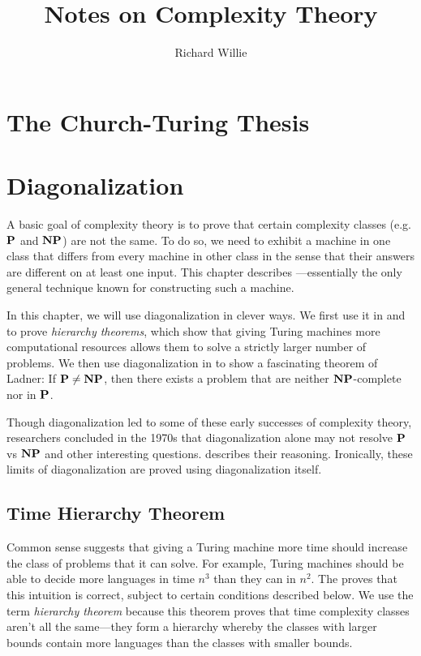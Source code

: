 \documentclass[11pt,twoside=off,numbers=noenddot]{scrbook}
\title{Notes on Complexity Theory}
\author{Richard Willie}
\begin{document}
\maketitle

\tableofcontents

\newpage

\chapter{The Church-Turing Thesis}

\chapter{Diagonalization}
A basic goal of complexity theory is to prove that certain complexity classes (e.g. $\textbf{P}$ and $\textbf{NP}$) are not the same. To do so, we need to exhibit a machine in one class that differs from every machine in other class in the sense that their answers are different on at least one input. This chapter describes —essentially the only general technique known for constructing such a machine.

In this chapter, we will use diagonalization in clever ways. We first use it in  and  to prove \emph{hierarchy theorems}, which show that giving Turing machines more computational resources allows them to solve a strictly larger number of problems. We then use diagonalization in  to show a fascinating theorem of Ladner: If $\textbf{P} \neq \textbf{NP}$, then there exists a problem that are neither $\textbf{NP}$-complete nor in $\textbf{P}$.

Though diagonalization led to some of these early successes of complexity theory, researchers concluded in the 1970s that diagonalization alone may not resolve $\textbf{P}$ vs $\textbf{NP}$ and other interesting questions.  describes their reasoning. Ironically, these limits of diagonalization are proved using diagonalization itself.

\section{Time Hierarchy Theorem}
Common sense suggests that giving a Turing machine more time should increase the class of problems that it can solve. For example, Turing machines should be able to decide more languages in time $n^3$ than they can in $n^2$. The  proves that this intuition is correct, subject to certain conditions described below. We use the term \emph{hierarchy theorem} because this theorem proves that time complexity classes aren't all the same—they form a hierarchy whereby the classes with larger bounds contain more languages than the classes with smaller bounds.
\end{document}
